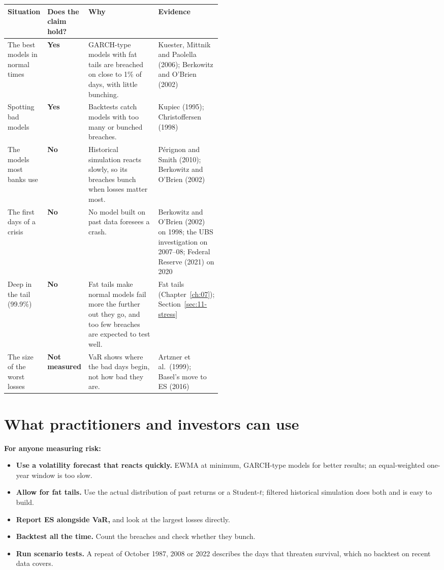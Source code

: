 \begin{center}
\small
\begin{tabularx}{\linewidth}{@{}>{\raggedright\arraybackslash}p{0.17\linewidth}>{\raggedright\arraybackslash}p{0.10\linewidth}>{\raggedright\arraybackslash}X>{\raggedright\arraybackslash}p{0.22\linewidth}@{}}
\toprule
Situation & Does the claim hold? & Why & Evidence \\
\midrule
The best models in normal times & \textbf{Yes} & GARCH-type models with fat tails are breached on close to 1\% of days, with little bunching. & Kuester, Mittnik and Paolella (2006); Berkowitz and O'Brien (2002) \\
Spotting bad models & \textbf{Yes} & Backtests catch models with too many or bunched breaches. & Kupiec (1995); Christoffersen (1998) \\
The models most banks use & \textbf{No} & Historical simulation reacts slowly, so its breaches bunch when losses matter most. & P\'erignon and Smith (2010); Berkowitz and O'Brien (2002) \\
The first days of a crisis & \textbf{No} & No model built on past data foresees a crash. & Berkowitz and O'Brien (2002) on 1998; the UBS investigation on 2007--08; Federal Reserve (2021) on 2020 \\
Deep in the tail (99.9\%) & \textbf{No} & Fat tails make normal models fail more the further out they go, and too few breaches are expected to test well. & Fat tails (Chapter~\ref{ch:07}); Section~\ref{sec:11-stress} \\
The size of the worst losses & \textbf{Not measured} & VaR\index{Value at Risk (VaR)!backtesting} shows where the bad days begin, not how bad they are. & Artzner et al.\ (1999); Basel's move to ES (2016) \\
\bottomrule
\end{tabularx}
\end{center}

\section{What practitioners and investors can use}
\label{sec:11-investors}

\textbf{For anyone measuring risk:}

\begin{itemize}
  \item \textbf{Use a volatility forecast that reacts quickly.} EWMA at minimum, GARCH-type models for better results; an equal-weighted one-year window is too slow.
  \item \textbf{Allow for fat tails.} Use the actual distribution of past returns or a Student-$t$; filtered historical simulation does both and is easy to build.
  \item \textbf{Report ES alongside VaR,} and look at the largest losses directly.
  \item \textbf{Backtest all the time.} Count the breaches and check whether they bunch.
  \item \textbf{Run scenario tests.} A repeat of October 1987, 2008 or 2022 describes the days that threaten survival, which no backtest on recent data covers.
\end{itemize}


